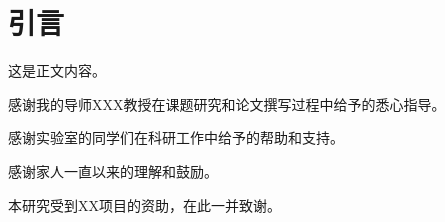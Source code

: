 \documentclass{sduthesis}
\begin{document}
\makecover

\tableofcontents

\chapter{引言}
这是正文内容。

\begin{acknowledgement}
  感谢我的导师XXX教授在课题研究和论文撰写过程中给予的悉心指导。

  感谢实验室的同学们在科研工作中给予的帮助和支持。

  感谢家人一直以来的理解和鼓励。

  本研究受到XX项目的资助，在此一并致谢。
\end{acknowledgement}

\printbibliography
\end{document}
